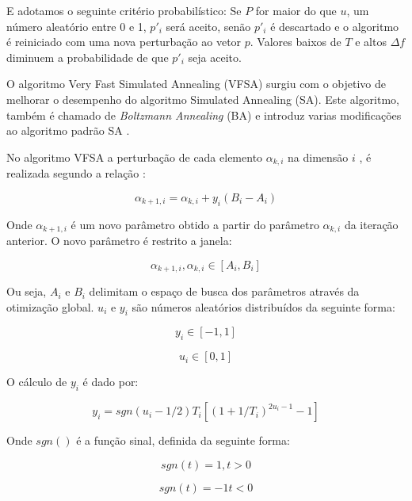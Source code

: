 E adotamos o seguinte critério probabilístico: 
Se $P$ for maior do que $u$, um número aleatório entre 0 e 1, $p'_i$ será aceito, senão $p'_i$ é
descartado e o algoritmo é reiniciado com uma nova perturbação ao vetor $p$.
Valores baixos de $T$ e altos $\Delta f$ diminuem a probabilidade de que $p'_i$ seja aceito.

O algoritmo Very
Fast Simulated Annealing (VFSA) surgiu com o objetivo de melhorar o desempenho do algoritmo Simulated Annealing (SA). 
Este algoritmo, também é chamado de \textit{Boltzmann Annealing} (BA) e
introduz varias modificações ao
algoritmo padrão SA \cite{ingber}.

No algoritmo VFSA a perturbação de cada elemento $\alpha_{k,i}$ na dimensão $i$ , é realizada
segundo a relação \cite{klaus}:

\begin{equation}
\label{eq:3.3}
 \alpha_{k+1,i}=\alpha_{k,i}+y_i(B_i-A_i)
\end{equation}

Onde $\alpha_{k+1,i}$ é um novo parâmetro obtido a partir do parâmetro $\alpha_{k,i}$ da iteração anterior.
O novo parâmetro é restrito a janela:

\begin{equation}
\label{eq:3.4}
  \alpha_{k+1,i},\alpha_{k,i}\in[A_i,B_i]
\end{equation}

Ou seja, $A_i$ e $B_i$ delimitam o espaço de busca dos parâmetros através da otimização global. 
$u_i$ e $y_i$ são números aleatórios distribuídos da seguinte forma:

\begin{equation}
\label{eq:3.5}
  y_i\in[-1,1]
\end{equation}

\begin{equation}
\label{eq:3.6}
  u_i\in[0,1]
\end{equation}

O cálculo de $y_i$ é dado por:

\begin{equation}
\label{eq:3.7}
  y_i=sgn(u_i-1/2)T_i[(1+1/T_i)^{2u_i-1}-1]
\end{equation}

Onde $sgn()$ é a função sinal, definida da seguinte forma:

$$sgn(t)=1, t > 0$$

$$sgn(t)=-1 t < 0$$


